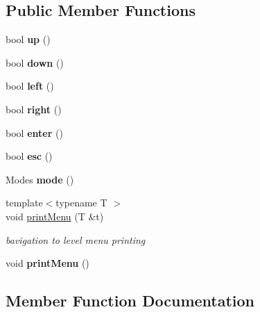 \subsection*{Public Member Functions}
\begin{DoxyCompactItemize}
\item 
\mbox{\label{structNavRoot_a9561689a3b3e22e2bd2b7d2e81d4f60e}} 
bool {\bfseries up} ()
\item 
\mbox{\label{structNavRoot_a49465832033d1ca3d67d4185cd5064d0}} 
bool {\bfseries down} ()
\item 
\mbox{\label{structNavRoot_a030d817943c956afa8f1465b8f085d0d}} 
bool {\bfseries left} ()
\item 
\mbox{\label{structNavRoot_abdf3abf63db594400824b56a9eed2c03}} 
bool {\bfseries right} ()
\item 
\mbox{\label{structNavRoot_a3e808af28e2f4d43710309e20a4ca3ee}} 
bool {\bfseries enter} ()
\item 
\mbox{\label{structNavRoot_a1c713f594a04d9159dd317bbb8c76e43}} 
bool {\bfseries esc} ()
\item 
\mbox{\label{structNavRoot_aad1657e2e5ae406e5dfe9602bdbc3bb4}} 
Modes {\bfseries mode} ()
\item 
{\footnotesize template$<$typename T $>$ }\\void \hyperlink{structNavRoot_a8e75e51c6a49e65d28849bbe4b151615}{print\+Menu} (T \&t)
\begin{DoxyCompactList}\small\item\em bavigation to level menu printing \end{DoxyCompactList}\item 
\mbox{\label{structNavRoot_ad684ebca9af961c99cb1cbfe32c5ee4a}} 
void {\bfseries print\+Menu} ()
\end{DoxyCompactItemize}


\subsection{Member Function Documentation}
\mbox{\label{structNavRoot_a8e75e51c6a49e65d28849bbe4b151615}} 
